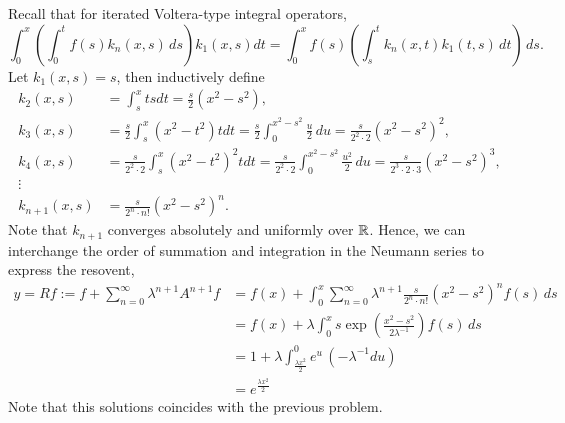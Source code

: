 \documentclass{homework}
\begin{document}
\begin{solution}
  Recall that for iterated Voltera-type integral operators,
  $$
    \int_0^x \left(\int_0^t f(s) k_n(x,s)\,ds \right) k_1(x,s)dt = \int_0^x f(s) \left(\int_s^t k_n(x,t)k_1(t,s)\,dt\right)\,ds.
  $$
  Let $k_1(x,s) = s$, then inductively define
  \begin{align}
    k_2(x,s) &= \int_s^x t s dt = \frac s2 (x^2 - s^2), \nonumber\\
    k_3(x,s) &= \frac s2 \int_s^x (x^2 - t^2) tdt = \frac s2 \int_0^{x^2 - s^2} \frac u2\,du = \frac s{2^2 \cdot 2} (x^2-s^2)^2, \nonumber\\
    k_4(x,s) &= \frac s{2^2\cdot2}  \int_s^x (x^2 - t^2)^2 tdt =  \frac s{2^2\cdot2} \int_0^{x^2 - s^2} \frac {u^2}2\,du = \frac s{2^3 \cdot 2\cdot 3} (x^2-s^2)^3, \nonumber\\
    \vdots\nonumber\\
    k_{n+1}(x,s) &= \frac s{2^n \cdot n!} (x^2-s^2)^n. \label{resolvent_kernel1}
  \end{align}
 Note that $k_{n+1}$ converges absolutely and uniformly over ${\mathbb R}$. Hence, we can interchange the order of summation and integration in the Neumann series to express the resovent,
 \begin{align*}
 y = R f := f + \sum_{n=0}^\infty \lambda^{n+1} A^{n+1} f 
 &= f(x) + \int_0^x \sum_{n=0}^\infty \lambda^{n+1} \frac s{2^n \cdot n!} (x^2-s^2)^n f(s)\,ds\\
 &= f(x) + \lambda \int_0^x s \exp\left(\frac{x^2 - s^2}{2\lambda^{-1}}\right) f(s)\,ds\\
 &= 1 + \lambda \int_{\frac{\lambda x^2}{2}}^0 e^u\,(-\lambda^{-1} du)\\
 &= e^{\frac{\lambda x^2}{2}}
 \end{align*}
 Note that this solutions coincides with the previous problem.
\end{solution} 
\newpage
{}
\end{document}
